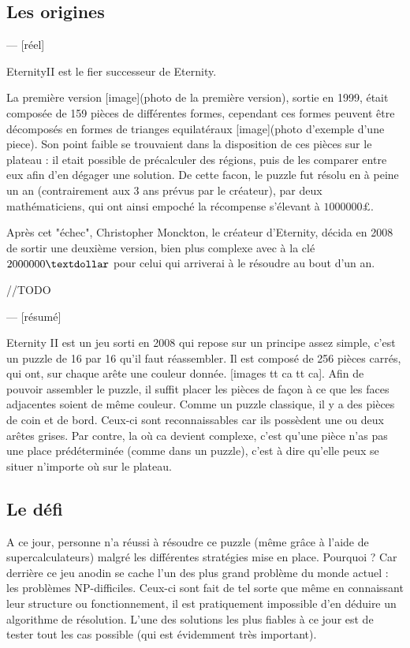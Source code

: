 \documentclass{article}
\begin{document}
	\subsection{Les origines}
	--- [réel]
	
	EternityII est le fier successeur de Eternity.
	
	La première version [image](photo de la première version), sortie en 1999, était composée de 159 pièces de différentes formes, cependant ces formes peuvent être décomposés en formes de trianges equilatéraux [image](photo d'exemple d'une piece). Son point faible se trouvaient dans la disposition de ces pièces sur le plateau : il etait possible de précalculer des régions, puis de les comparer entre eux afin d'en dégager une solution.
	De cette facon, le puzzle fut résolu en à peine un an (contrairement aux 3 ans prévus par le créateur), par deux mathématiciens, qui ont ainsi empoché la récompense s'élevant à $1000000\pounds$.
	
	Après cet "échec", Christopher Monckton, le créateur d'Eternity, décida en 2008 de sortir une deuxième version, bien plus complexe avec à la clé $2000000\textdollar$ pour celui qui arriverai à le résoudre au bout d'un an.
	
	//TODO
	
	
	--- [résumé]
	
	Eternity II est un jeu sorti en 2008 qui repose sur un principe assez simple, c'est un puzzle de 16 par 16 qu'il faut réassembler. Il est composé de 256 pièces carrés, qui ont, sur chaque arête une couleur donnée. [images tt ca tt ca]. Afin de pouvoir assembler le puzzle, il suffit placer les pièces de façon à ce que les faces adjacentes soient de même couleur. Comme un puzzle classique, il y a des pièces de coin et de bord. Ceux-ci sont reconnaissables car ils possèdent une ou deux arêtes grises. Par contre, la où ca devient complexe, c'est qu'une pièce n'as pas une place prédéterminée (comme dans un puzzle), c'est à dire qu'elle peux se situer n'importe où sur le plateau. 
	
	\subsection{Le défi}
	
	A ce jour, personne n'a réussi à résoudre ce puzzle (même grâce à l'aide de supercalculateurs) malgré les différentes stratégies mise en place. Pourquoi ? Car derrière ce jeu anodin se cache l'un des plus grand problème du monde actuel : les problèmes NP-difficiles. Ceux-ci sont fait de tel sorte que même en connaissant leur structure ou fonctionnement, il est pratiquement impossible d'en déduire un algorithme de résolution. L'une des solutions les plus fiables à ce jour est de tester tout les cas possible (qui est évidemment très important).
	
\end{document}
